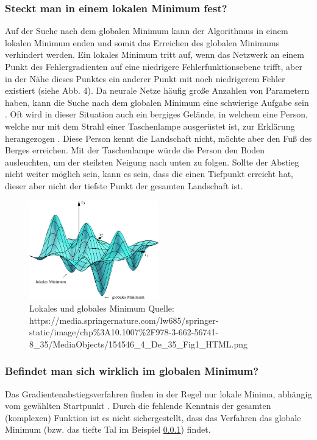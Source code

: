 \subsubsection{Steckt man in einem lokalen Minimum fest?}\label{subsec:gradientenverfahren:fehlerquellen_lokalen_minimum}
  Auf der Suche nach dem globalen Minimum kann der Algorithmus in einem lokalen Minimum enden und somit das Erreichen des globalen Minimums verhindert werden.
  Ein lokales Minimum tritt auf, wenn das Netzwerk an einem Punkt des Fehlergradienten auf eine niedrigere Fehlerfunktionsebene trifft, aber in der Nähe dieses Punktes ein anderer Punkt mit noch niedrigerem Fehler existiert (siehe Abb. 4).
  Da neurale Netze häufig große Anzahlen von Parametern haben, kann die Suche nach dem globalen Minimum eine schwierige Aufgabe sein \cite{HS97}.
  Oft wird in dieser Situation auch ein bergiges Gelände, in welchem eine Person, welche nur mit dem Strahl einer Taschenlampe ausgerüstet ist, zur Erklärung herangezogen \cite{TR17}.
  Diese Person kennt die Landschaft nicht, möchte aber den Fuß des Berges erreichen. Mit der Taschenlampe würde die Person den Boden ausleuchten, um der steilsten Neigung nach unten zu folgen.
  Sollte der Abstieg nicht weiter möglich sein, kann es sein, dass die einen Tiefpunkt erreicht hat, dieser aber nicht der tiefste Punkt der gesamten Landschaft ist.
  \\
  \begin{figure}[ht]
    \centering
    \includegraphics[width=0.5\textwidth]{Sources/03-3.3.2_3-dimensionaler_abstieg.png}
    \caption{Lokales und globales Minimum Quelle: https://media.springernature.com/lw685/springer-static/image/chp\%3A10.1007\%2F978-3-662-56741-8_35/MediaObjects/154546_4_De_35_Fig1_HTML.png}
    \label{subsec:lokale-globale-minima}
\end{figure}

\subsubsection{Befindet man sich wirklich im globalen Minimum?}\label{subsec:gradientenverfahren:fehlerquellen_globalen_minimum}
  Das Gradientenabstiegsverfahren finden in der Regel nur lokale Minima, abhängig vom gewählten Startpunkt \cite{HS97}.
  Durch die fehlende Kenntnis der gesamten (komplexen) Funktion ist es nicht sichergestellt, dass das Verfahren das globale Minimum (bzw. das tiefte Tal im Beispiel \ref*{subsec:gradientenverfahren:fehlerquellen_lokalen_minimum}) findet.

